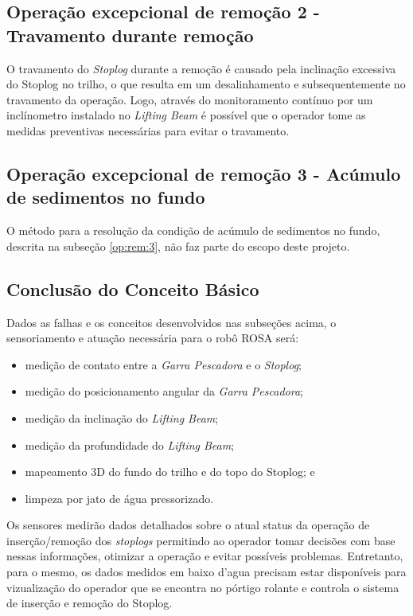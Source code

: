 
\subsection{Operação excepcional de remoção 2 - Travamento durante remoção}

O travamento do \emph{Stoplog} durante a remoção é causado pela inclinação excessiva do Stoplog no trilho, o que resulta em um desalinhamento e subsequentemente no travamento da operação. Logo, através do monitoramento contínuo por um inclínometro instalado no \emph{Lifting Beam} é possível que o operador tome as medidas preventivas necessárias para evitar o travamento.   


\subsection{Operação excepcional de remoção 3 - Acúmulo de sedimentos no fundo}
O método para a resolução da condição de acúmulo de sedimentos no fundo,
descrita na subseção \ref{op:rem:3}, não faz parte do escopo deste projeto.



\subsection{Conclusão do Conceito Básico}

Dados as falhas e os conceitos desenvolvidos nas subseções acima, o
sensoriamento e atuação necessária para o robô ROSA será:

\begin{itemize}

	\item medição de contato entre a \emph{Garra Pescadora} e o \emph{Stoplog}; 
	\item medição do posicionamento angular da \emph{Garra Pescadora}; 
	\item medição da inclinação do \emph{Lifting Beam};
	\item medição da profundidade do \emph{Lifting Beam}; 
	\item mapeamento 3D do fundo do trilho e do topo do Stoplog; e
	\item limpeza por jato de água pressorizado. 

\end{itemize}

Os sensores medirão dados detalhados sobre o atual status da
operação de inserção/remoção dos \emph{stoplogs} permitindo ao operador tomar decisões
com base nessas informações, otimizar a operação e evitar possíveis problemas.
Entretanto, para o mesmo, os dados medidos em baixo d'agua precisam estar
disponíveis para vizualização do operador que se encontra no pórtigo rolante e controla o sistema de inserção e remoção do Stoplog.

